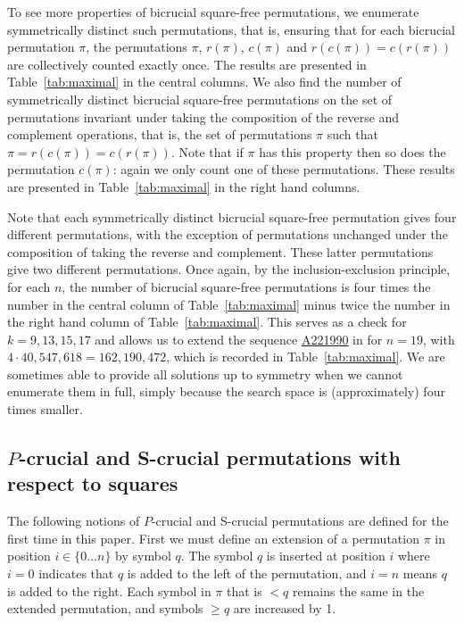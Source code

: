 \documentclass[12pt,reqno]{article}
\newcommand{\seqnum}[1]{\href{http://oeis.org/#1}{\underline{#1}}}
\begin{document}
To see more  properties of bicrucial square-free permutations, we enumerate symmetrically distinct such permutations, that is, ensuring that for each  bicrucial permutation $\pi$, the  permutations $\pi$, $r(\pi)$, $c(\pi)$ and $r(c(\pi))=c(r(\pi))$ are collectively counted exactly once. The results are presented in Table~\ref{tab:maximal} in the central columns. We also find the number of symmetrically distinct bicrucial square-free permutations on the set of permutations invariant under taking the composition of the reverse and complement operations, that is, the set of permutations $\pi$ such that $\pi=r(c(\pi))=c(r(\pi))$. Note that if $\pi$ has this property then so does the permutation $c(\pi)$: again we only count one of these permutations. These results are presented in Table~\ref{tab:maximal} in the right hand columns.

Note that each symmetrically distinct bicrucial square-free permutation gives four different permutations, with the exception of permutations unchanged under the composition of taking the reverse and complement. These latter permutations give two different permutations.  
Once again, by the inclusion-exclusion principle, for each $n$, the number of bicrucial square-free permutations is four times the number in the central column of Table~\ref{tab:maximal} minus twice the number in the right hand column of
Table~\ref{tab:maximal}.   This serves as a check for $k=9,13,15, 17$ and allows us to extend the sequence \seqnum{A221990} in \cite{OEIS} for 
 $n=19$, with $4\cdot 40,547,618=162,190,472$, which is recorded in Table~\ref{tab:maximal}.  We are sometimes able to provide all solutions up to symmetry when we cannot enumerate them in full, simply because the search space is (approximately) four times smaller.


\subsection{$P$-crucial and S-crucial permutations with respect to squares}\label{P-crucial-S-crucial}

The following notions of $P$-crucial and S-crucial permutations are defined for the first time in this paper. First we must define an extension of a permutation $\pi$ in position $i\in \{0\ldots n\}$ by symbol $q$. The symbol $q$ is inserted at position $i$ where $i=0$ indicates that $q$ is added to the left of the permutation, and $i=n$ means $q$ is added to the right. Each symbol in $\pi$ that is $<q$ remains the same in the extended permutation, and symbols $\geq q$ are increased by 1. 
\end{document}
